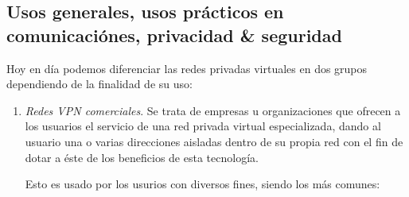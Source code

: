 \documentclass[a4paper, 11pt, titlepage]{article}
\begin{document}
    \subsection{Usos generales, usos prácticos en comunicaciónes, privacidad \& seguridad}

        Hoy en día podemos diferenciar las redes privadas virtuales en dos grupos dependiendo de la finalidad de su
        uso:
        
        \begin{enumerate}
            \item \textit{Redes VPN comerciales}. Se trata de empresas u organizaciones que ofrecen a los usuarios el
            servicio de una red privada virtual especializada, dando al usuario una o varias direcciones aisladas dentro 
            de su propia red con el fin de dotar a éste de los beneficios de esta tecnología. 
            
            Esto es usado por los usurios con diversos fines, siendo los más comunes:
        

\end{enumerate}
\end{document}
